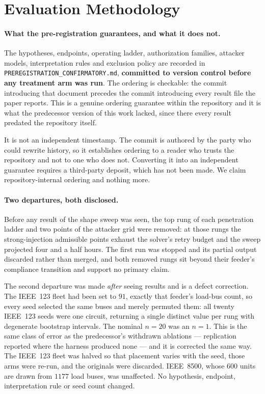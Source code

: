 \section{Evaluation Methodology}\label{sec:protocol}

\paragraph{What the pre-registration guarantees, and what it does not.}
The hypotheses, endpoints, operating ladder, authorization families, attacker models,
interpretation rules and exclusion policy are recorded in
\texttt{PREREGISTRATION\_CONFIRMATORY.md}, \textbf{committed to version control before any
treatment arm was run}. The ordering is checkable: the commit introducing that document precedes
the commit introducing every result file the paper reports. This is a genuine ordering guarantee
within the repository and it is what the predecessor version of this work lacked, since there
every result predated the repository itself.

It is not an independent timestamp. The commit is authored by the party who could rewrite history,
so it establishes ordering to a reader who trusts the repository and not to one who does not.
Converting it into an independent guarantee requires a third-party deposit, which has not been
made. We claim repository-internal ordering and nothing more.

\paragraph{Two departures, both disclosed.}
Before any result of the shape sweep was seen, the top rung of each penetration ladder and two
points of the attacker grid were removed: at those rungs the strong-injection admissible points
exhaust the solver's retry budget and the sweep projected four and a half hours. The first run was
stopped and its partial output discarded rather than merged, and both removed rungs sit beyond
their feeder's compliance transition and support no primary claim.

The second departure was made \emph{after} seeing results and is a defect correction. The IEEE~123
fleet had been set to $91$, exactly that feeder's load-bus count, so every seed selected the same
buses and merely permuted them: all twenty IEEE~123 seeds were one circuit, returning a single
distinct value per rung with degenerate bootstrap intervals. The nominal $n{=}20$ was an $n{=}1$.
This is the same class of error as the predecessor's withdrawn ablations --- replication reported
where the harness produced none --- and it is corrected the same way. The IEEE~123 fleet was
halved so that placement varies with the seed, those arms were re-run, and the originals were
discarded. IEEE~8500, whose $600$ units are drawn from $1177$ load buses, was unaffected. No
hypothesis, endpoint, interpretation rule or seed count changed.

